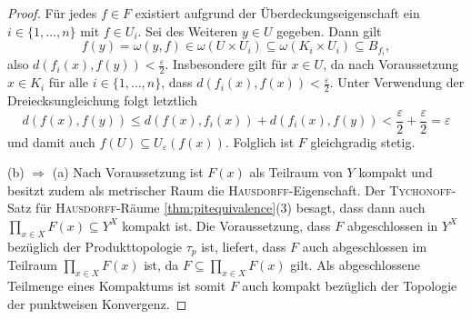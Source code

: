 \begin{proof}
  Für jedes $f \in F$ existiert aufgrund der Überdeckungseigenschaft ein $i \in \{ 1,\dots,n\}$ mit $f \in U_i$.
  Sei des Weiteren $y \in U$ gegeben.
  Dann gilt
  \begin{displaymath}
    f(y) = \omega(y,f) \in \omega(U \times U_i) \subseteq \omega(K_i \times U_i) \subseteq B_{f_i},
  \end{displaymath}
  also $d(f_i(x),f(y)) < \frac{\varepsilon}{2}$.
  Insbesondere gilt für $x \in U$, da nach Voraussetzung $x \in K_i$ für alle $i \in \{ 1,\dots,n\}$, dass $d(f_i(x),f(x)) < \frac{\varepsilon}{2}$.
  Unter Verwendung der Dreiecksungleichung folgt letztlich
  \begin{displaymath}
    d(f(x),f(y)) \leq d(f(x),f_i(x)) + d(f_i(x),f(y)) < \frac{\varepsilon}{2} + \frac{\varepsilon}{2} = \varepsilon
  \end{displaymath}
  und damit auch $f(U) \subseteq U_\varepsilon(f(x))$.
  Folglich ist $F$ gleichgradig stetig.

  (b) $\Rightarrow$ (a)
  Nach Voraussetzung ist $F(x)$ als Teilraum von $Y$ kompakt und besitzt zudem als metrischer Raum die \textsc{Hausdorff}\hyp{}Eigenschaft.
  Der \textsc{Tychonoff}\hyp{}Satz für \textsc{Hausdorff}\hyp{}Räume \ref{thm:pitequivalence}(3) besagt, dass dann auch $\prod_{x \in X} F(x) \subseteq Y^X$ kompakt ist.
  Die Voraussetzung, dass $F$ abgeschlossen in $Y^X$ bezüglich der Produkttopologie $\tau_p$ ist, liefert, dass $F$ auch abgeschlossen im Teilraum $\prod_{x \in X} F(x)$ ist, da $F \subseteq \prod_{x \in X} F(x)$ gilt.
  Als abgeschlossene Teilmenge eines Kompaktums ist somit $F$ auch kompakt bezüglich der Topologie der punktweisen Konvergenz.


\end{proof}
